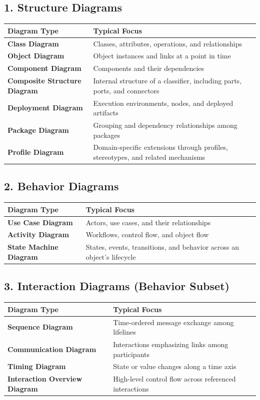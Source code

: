 \documentclass[11pt]{article}
\begin{document}
\subsection*{1. Structure Diagrams}
\begin{tabularx}{\textwidth}{@{}>{\raggedright\arraybackslash\bfseries}p{}Y@{}}
\toprule
Diagram Type & Typical Focus \\
\midrule
Class Diagram & Classes, attributes, operations, and relationships \\
Object Diagram & Object instances and links at a point in time \\
Component Diagram & Components and their dependencies \\
Composite Structure Diagram & Internal structure of a classifier, including parts, ports, and connectors \\
Deployment Diagram & Execution environments, nodes, and deployed artifacts \\
Package Diagram & Grouping and dependency relationships among packages \\
Profile Diagram & Domain-specific extensions through profiles, stereotypes, and related mechanisms \\
\bottomrule
\end{tabularx}

\subsection*{2. Behavior Diagrams}
\begin{tabularx}{\textwidth}{@{}>{\raggedright\arraybackslash\bfseries}p{}Y@{}}
\toprule
Diagram Type & Typical Focus \\
\midrule
Use Case Diagram & Actors, use cases, and their relationships \\
Activity Diagram & Workflows, control flow, and object flow \\
State Machine Diagram & States, events, transitions, and behavior across an object's lifecycle \\
\bottomrule
\end{tabularx}

\subsection*{3. Interaction Diagrams (Behavior Subset)}
\begin{tabularx}{\textwidth}{@{}>{\raggedright\arraybackslash\bfseries}p{}Y@{}}
\toprule
Diagram Type & Typical Focus \\
\midrule
Sequence Diagram & Time-ordered message exchange among lifelines \\
Communication Diagram & Interactions emphasizing links among participants \\
Timing Diagram & State or value changes along a time axis \\
Interaction Overview Diagram & High-level control flow across referenced interactions \\
\bottomrule
\end{tabularx}
\end{document}
